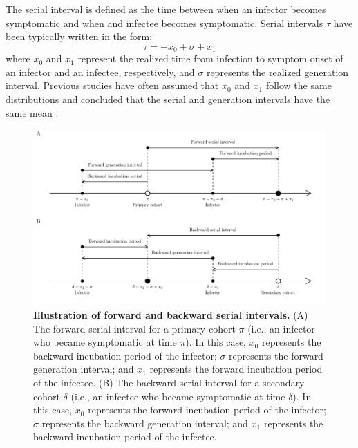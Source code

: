 \documentclass[12pt]{article}
\newcommand{\comment}{\showcomment}
\newcommand{\showcomment}[3]{\textcolor{#1}{\textbf{[#2: }\textsl{#3}\textbf{]}}}
\newcommand{\jd}[1]{\comment{cyan}{JD}{#1}}
\begin{document}
The serial interval is defined as the time between when an infector becomes symptomatic and when and infectee becomes symptomatic.
Serial intervals $\tau$ have been typically written in the form:
\begin{equation}
\tau = - x_0 + \sigma + x_1
\end{equation}
where $x_0$ and $x_1$ represent the realized time from infection to symptom onset of an infector and an infectee, respectively, and $\sigma$ represents the realized generation interval.
Previous studies have often assumed that $x_0$ and $x_1$ follow the same distributions and concluded that the serial and generation intervals have the same mean \citep{svensson2007note,klinkenberg2011correlation,champredon2018equivalence, britton2019estimation}.

\begin{figure}[!th]
\includegraphics[width=\textwidth]{serial_guide.pdf}
\caption{
\textbf{Illustration of forward and backward serial intervals.}
(A) The forward serial interval for a primary cohort $\pi$ (i.e., an infector who became symptomatic at time $\pi$).
In this case, $x_0$ represents the backward incubation period of the infector;
$\sigma$ represents the forward generation interval;
and $x_1$ represents the forward incubation period of the infectee.
(B) The backward serial interval for a secondary cohort $\delta$ (i.e., an infectee who became symptomatic at time $\delta$).
In this case, $x_0$ represents the forward incubation period of the infector;
$\sigma$ represents the backward generation interval;
and $x_1$ represents the backward incubation period of the infectee.
}
\label{fig:diagram}
\end{figure}
\end{document}
